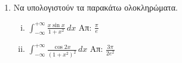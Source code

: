 \begin{enumerate}
\item Να υπολογιστούν τα παρακάτω ολοκληρώματα.

  \begin{enumerate}[i)]
    \item $\int_{-\infty}^{+\infty}\frac{x\sin x}{1+x^2}\,dx$ 
      \hfill  Απ: $\frac{\pi}{e}$
    \item $\int_{-\infty}^{+\infty}\frac{\cos 2x}{(1+x^2)^2}\,dx$ 
      \hfill  Απ: $\frac{3\pi}{2e^2}$
  \end{enumerate}
\end{enumerate}




